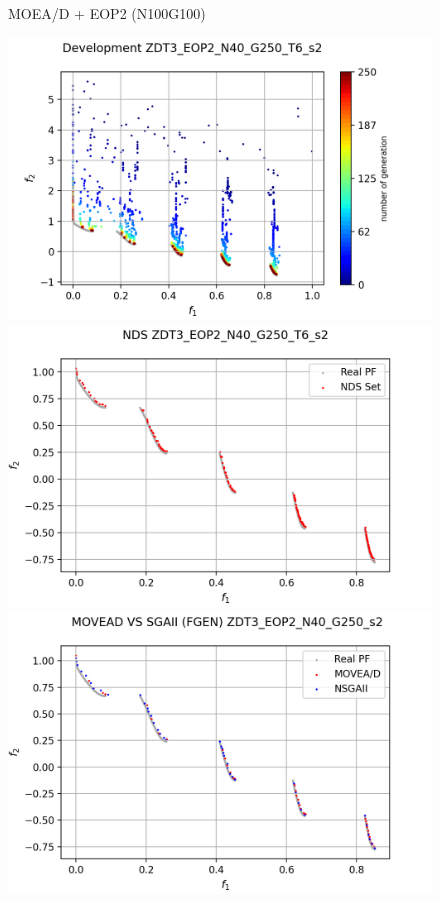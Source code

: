 \begin{minipage}[H]{\linewidth}
\begin{minipage}[b]{0.3\linewidth}
\begin{figure}[H]
        \caption{\centering MOEA/D + EOP2 (N100G100)}
        \label{fig:10}
    \end{figure}
\end{minipage} \quad
\begin{minipage}[b]{0.3\linewidth}
\begin{figure}[H]
        \centering
        \includegraphics[scale=0.4]{figures/ZDT3_EOP2_N40_G250_T6/s2_dev.png}\\
        \includegraphics[scale=0.36]{figures/ZDT3_EOP2_N40_G250_T6/s2_nds.png}\\
        \includegraphics[scale=0.36]{figures/ZDT3_EOP2_N40_G250_T6/s2_comp.png}\\

\end{figure}
\end{minipage}
\end{minipage}
